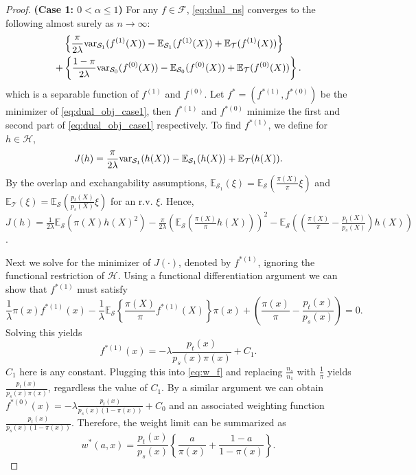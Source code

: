 \documentclass[12pt]{article}
\newcommand{\E}{\mathbb{E}}
\newcommand{\var}{\textnormal{var}}
\begin{document}
\begin{proof}
	\noindent \textbf{(Case 1: $0 < \alpha \le 1$)} For any $f \in \mathcal{F}$, \eqref{eq:dual_ns} converges to the following almost surely as $n \rightarrow \infty$:
	\begin{equation}
		\label{eq:dual_obj_case1}
		\begin{aligned}
			&\left\{ 
			\frac{\pi}{2\lambda} \var_{\mathcal{S}_1}(f^{(1)}(X)) -
			\E_{\mathcal{S}_1}(f^{(1)}(X)) + \E_\mathcal{T}(f^{(1)}(X))
			\right\}
			\\+
			&\left\{ 
			\frac{1-\pi}{2\lambda} \var_{\mathcal{S}_0}(f^{(0)}(X)) -
			\E_{\mathcal{S}_0}(f^{(0)}(X)) + \E_\mathcal{T}(f^{(0)}(X))
			\right\}
			.\end{aligned}
	\end{equation}
	which is a separable function of $f^{(1)}$ and $f^{(0)}$. Let $f^* = (f^{*(1)}, f^{*(0)})$ be the minimizer of \eqref{eq:dual_obj_case1}, then $f^{*(1)}$ and $f^{*(0)}$ minimize the first and second part of \eqref{eq:dual_obj_case1} respectively. To find $f^{*(1)}$, we define for $h \in \mathcal{H}$,
	\begin{equation*}
		J(h) = \frac{\pi}{2\lambda} \var_{\mathcal{S}_1}(h(X)) -
		\E_{\mathcal{S}_1}(h(X)) + \E_\mathcal{T}(h(X))
		.\end{equation*}
	By the overlap and exchangability assumptions, $\E_{\mathcal{S}_1}(\xi) = \E_\mathcal{S}(\frac{\pi(X)}{\pi} \xi)$ and $\E_\mathcal{T}(\xi) = \E_\mathcal{S}(\frac{p_t(X)}{p_s(X)} \xi)$ for an r.v. $\xi$. Hence, 
	$J(h) =
	\frac{1}{2\lambda} \E_{\mathcal{S}} (\pi(X)h(X)^2) -
	\frac{\pi}{2\lambda} \left( \E_{\mathcal{S}} \left( \frac{\pi(X)}{\pi} h(X) \right) \right)^2 -
	\E_{\mathcal{S}} \left( \left( \frac{\pi(X)}{\pi} - \frac{p_t(X)}{p_s(X)} \right) h(X)\right)
	$.
	
	Next we solve for the minimizer of $J(\cdot)$, denoted by $f^{*(1)}$, ignoring the functional restriction of $\mathcal{H}$. Using a functional differentiation argument we can show that $f^{*(1)}$ must satisfy
	\begin{equation*}
		\frac{1}{\lambda} \pi(x) f^{*(1)}(x) - 
		\frac{1}{\lambda} \E_{\mathcal{S}} \left\{\frac{\pi(X)}{\pi} f^{*(1)}(X) \right\} \pi(x) +
		\left( \frac{\pi(x)}{\pi} - \frac{p_t(x)}{p_s(x)} \right)
		= 0
		.\end{equation*}
	Solving this yields
	\begin{equation*}
		f^{*(1)}(x) = -\lambda \frac{p_t(x)}{p_s(x)\pi(x)} + C_1
		.\end{equation*}
	$C_1$ here is any constant. Plugging this into \eqref{eq:w_f} and replacing $\frac{n_s}{n_1}$ with $\frac{1}{\pi}$ yields $\frac{p_t(x)}{p_s(x)\pi(x)}$, regardless the value of $C_1$. 
	By a similar argument we can obtain
	$f^{*(0)}(x) = -\lambda \frac{p_t(x)}{p_s(x)(1-\pi(x))} + C_0$ and an associated weighting function $\frac{p_t(x)}{p_s(x) (1 - \pi(x))}$. Therefore, the weight limit can be summarized as
	\begin{equation*}
		w^*(a, x) = \frac{p_t(x)}{p_s(x)} \left\{ \frac{a}{\pi(x)} + \frac{1-a}{1-\pi(x)} \right\}
		.\end{equation*} 
	

\end{proof}
\end{document}
